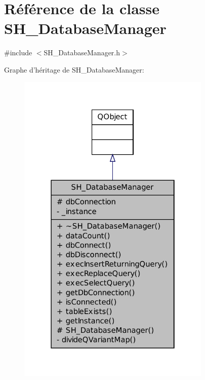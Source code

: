 \hypertarget{classSH__DatabaseManager}{\section{Référence de la classe S\-H\-\_\-\-Database\-Manager}
\label{classSH__DatabaseManager}
}


{\ttfamily \#include $<$S\-H\-\_\-\-Database\-Manager.\-h$>$}



Graphe d'héritage de S\-H\-\_\-\-Database\-Manager\-:\nopagebreak
\begin{figure}[H]
\begin{center}
\leavevmode
\includegraphics[width=262pt]{classSH__DatabaseManager__inherit__graph}
\end{center}
\end{figure}


